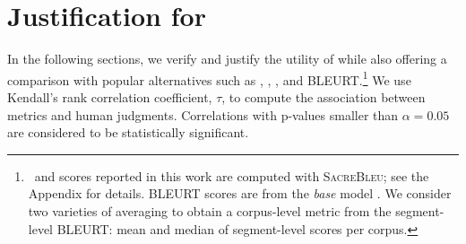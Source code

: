 \section{Justification for }
\label{sec:justific}

In the following sections, we verify and justify the utility of  while also offering a comparison with popular alternatives such as , \bleu, , and BLEURT.\footnote{\bleu\ and  scores reported in this work are computed with \textsc{SacreBleu}; see the Appendix for details.
BLEURT scores are from the \textit{base} model \citep{sellam-etal-2020-bleurt}. We consider two varieties of averaging to obtain a corpus-level metric from the segment-level BLEURT: mean and median of segment-level scores per corpus.
}
We use Kendall's rank correlation coefficient, $\tau$, to compute the association between metrics and human judgments.
Correlations with p-values smaller than $\alpha=0.05$ are considered to be statistically significant.



